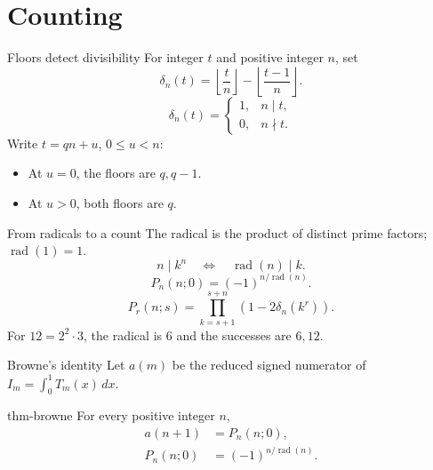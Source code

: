\documentclass{beamer}
\begin{document}
\section{Counting}
\begin{frame}{Floors detect divisibility}
For integer $t$ and positive integer $n$, set
\[
\delta_n(t)=\left\lfloor\frac tn\right\rfloor-\left\lfloor\frac{t-1}{n}\right\rfloor.
\]
\[
\delta_n(t)=\begin{cases}1,&n\mid t,\\0,&n\nmid t.\end{cases}
\]
Write $t=qn+u$, $0\le u<n$:
\begin{itemize}
\item At $u=0$, the floors are $q,q-1$.
\item At $u>0$, both floors are $q$.
\end{itemize}
\end{frame}
\begin{frame}{From radicals to a count}
The radical is the product of distinct prime factors; $\operatorname{rad}(1)=1$.
\[
n\mid k^n\quad\Longleftrightarrow\quad\operatorname{rad}(n)\mid k.
\]
\[
P_n(n;0)=(-1)^{n/\operatorname{rad}(n)}.
\]
\[
P_r(n;s)=\prod_{k=s+1}^{s+n}(1-2\delta_n(k^r)).
\]
For $12=2^2\cdot3$, the radical is $6$ and the successes are $6,12$.
\end{frame}
\begin{frame}{Browne's identity}
Let $a(m)$ be the reduced signed numerator of $I_m=\int_0^1T_m(x)\,dx$.
\begin{bookresult}{thm-browne}
For every positive integer $n$,
\[
\begin{aligned}
a(n+1)&=P_n(n;0),\\
P_n(n;0)&=(-1)^{n/\operatorname{rad}(n)}.
\end{aligned}
\]
\end{bookresult}
\end{frame}
\end{document}
